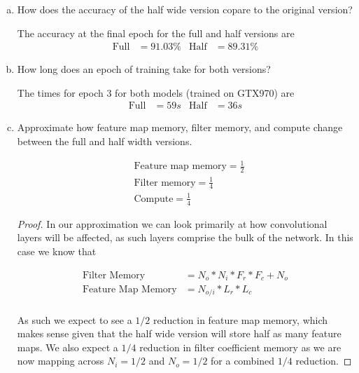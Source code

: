 \documentclass[11pt]{article}
\begin{document}
\begin{enumerate}[(a)]
	\item How does the accuracy of the half wide version copare to the original
		version?
	\begin{solution}
		The accuracy at the final epoch for the full and half versions are
		\begin{align}
			\text{Full} &= 91.03\%
			&
			\text{Half} &= 89.31\%
		\end{align}
	\end{solution}

	\item How long does an epoch of training take for both versions?
	\begin{solution}
		The times for epoch $3$ for both models (trained on GTX970) are
		\begin{align}
			\text{Full} &= 59s
			&
			\text{Half} &= 36s
		\end{align}
	\end{solution}

	\item Approximate how feature map memory, filter memory, and compute change
		between the full and half width versions.
	\begin{solution}

		\begin{align}
			&\text{Feature map memory} = \frac{1}{2}
			\\
			&\text{Filter memory} = \frac{1}{4}
			\\
			&\text{Compute} = \frac{1}{4}
		\end{align}
	\end{solution}
	\begin{proof}

		In our approximation we can look primarily at how convolutional layers will
		be affected, as such layers comprise the bulk of the network. In this case
		we know that

		\begin{align}
			\text{Filter Memory} &= N_o * N_i * F_r * F_c + N_o \\
			\text{Feature Map Memory} &= N_{o/i} * L_r * L_c\\
		\end{align}

		As such we expect to see a $1/2$ reduction in feature map memory, which
		makes sense given that the half wide version will store half as many
		feature maps. We also expect a $1/4$ reduction in filter coefficient
		memory as we are now mapping across $N_i=1/2$ and $N_o=1/2$ for a
		combined $1/4$ reduction.
		\newline


\end{proof}
\end{enumerate}
\end{document}
